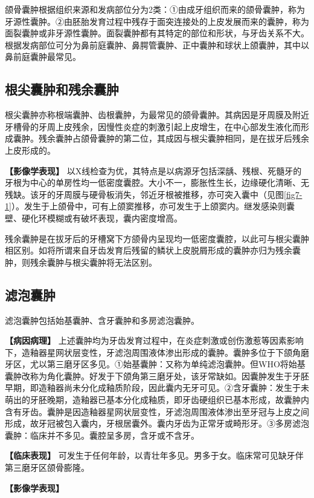颌骨囊肿根据组织来源和发病部位分为2类：①由成牙组织而来的颌骨囊肿，称为牙源性囊肿。②由胚胎发育过程中残存于面突连接处的上皮发展而来的囊肿，称为面裂囊肿或非牙源性囊肿。面裂囊肿都有其特定的部位和形状，与牙齿关系不大。根据发病部位可分为鼻前庭囊肿、鼻腭管囊肿、正中囊肿和球状上颌囊肿，其中以鼻前庭囊肿最常见。

\subsection{根尖囊肿和残余囊肿}

根尖囊肿亦称根端囊肿、齿根囊肿，为最常见的颌骨囊肿。其病因是牙周膜及附近牙槽骨的牙周上皮残余，因慢性炎症的刺激引起上皮增生，在中心部发生液化而形成囊肿。残余囊肿占颌骨囊肿的第二位，其成因与根尖囊肿相同，是在拔牙后残余上皮形成的。

\textbf{【影像学表现】}
以X线检查为优，其特点是以病源牙包括深龋、残根、死髓牙的牙根为中心的单房性均一低密度囊腔。大小不一，膨胀性生长，边缘硬化清晰、无残缺。该牙的牙周膜与硬骨板消失，邻近牙根被推移，亦可突入囊中（见图\ref{fig7-1}）。发生于上颌骨中，可有上颌窦推移，亦可发生于上颌窦内。继发感染则囊壁、硬化环模糊或有破坏表现，囊内密度增高。

残余囊肿是在拔牙后的牙槽窝下方颌骨内呈现均一低密度囊腔，以此可与根尖囊肿相区别。如将所谓来自牙齿发育后残留的鳞状上皮脱屑形成的囊肿亦归为残余囊肿，则残余囊肿与根尖囊肿将无法区别。

\subsection{滤泡囊肿}

滤泡囊肿包括始基囊肿、含牙囊肿和多房滤泡囊肿。

\textbf{【病因病理】}
上述囊肿均为牙齿发育过程中，在炎症刺激或创伤激惹等因素影响下，造釉器星网状层变性，牙滤泡周围液体渗出形成的囊肿。囊肿多位于下颌角磨牙区，尤以第三磨牙区多见。①始基囊肿：又称为单纯滤泡囊肿。但WHO将始基囊肿改称为角化囊肿。好发于下颌角第三磨牙处，该牙常缺如。因囊肿发生于牙胚早期，即造釉器尚未分化成釉质阶段，因此囊内无牙可见。②含牙囊肿：发生于未萌出的牙胚晚期，造釉器已基本分化成釉质，即牙齿硬组织已基本形成，故囊肿内含有牙齿。囊肿是因造釉器星网状层变性，牙滤泡周围液体渗出至牙冠与上皮之间形成，故牙冠被包入囊内，牙根居囊外。囊内牙齿为正常牙或畸形牙。③多房滤泡囊肿：临床并不多见。囊腔呈多房，含牙或不含牙。

\textbf{【临床表现】}
可发生于任何年龄，以青壮年多见。男多于女。临床常可见缺牙伴第三磨牙区颌骨膨隆。

\textbf{【影像学表现】}

